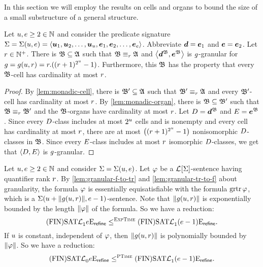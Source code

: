 
In this section we will employ the results on cells and organs to bound the size
of a small substructure of a general structure.

\begin{remark}\label{rem:monadic-granular}
Let $u, e \geq 2 \in \mathbb{N}$ and consider the predicate
signature $\mathrm{\Sigma} = \mathrm{\Sigma}(u,e) =
\left\langle \bm{u}_{1},\bm{u}_{2},\dots,\bm{u}_{u},\bm{e}_{1},\bm{e}_{2},\dots,\bm{e}_{e} \right\rangle$.
Abbreviate $\bm{d} = \bm{e}_{1}$ and $\bm{e} = \bm{e}_{2}$.
Let $r \in \mathbb{N}^{+}$.
There is $\mathfrak{B} \subseteq \mathfrak{A}$ such that
$\mathfrak{B} \equiv_{r} \mathfrak{A}$ and $\left\langle \bm{d}^{\mathfrak{B}}, \bm{e}^{\mathfrak{B}} \right\rangle$ is $g$-granular
for $g = g(u,r) = r.((r+1)^{2^u}-1)$.
Furthermore, this $\mathfrak{B}$ has the property that every $\mathfrak{B}$-cell has
cardinality at most $r$.
\end{remark}
\begin{proof}
By \cref{lem:monadic-cell}, there is $\mathfrak{B'} \subseteq \mathfrak{A}$ such that
$\mathfrak{B'} \equiv_{r} \mathfrak{A}$ and every $\mathfrak{B'}$-cell has cardinality at most $r$.
By \cref{lem:monadic-organ}, there is $\mathfrak{B} \subseteq \mathfrak{B'}$ such that
$\mathfrak{B} \equiv_{r} \mathfrak{B'}$ and the $\mathfrak{B}$-organs have cardinality at most $r$.
Let $D = \bm{d}^{\mathfrak{B}}$ and $E = \bm{e}^{\mathfrak{B}}$.
Since every $D$-class includes at most $2^u$ cells and is
nonempty and every cell has cardinality at most $r$,
there are at most $\left((r+1)^{2^u}-1\right)$ nonisomorphic
$D$-classes in $\mathfrak{B}$.
Since every $E$-class includes at most $r$ isomorphic $D$-classes,
we get that $\left\langle D, E \right\rangle$ is $g$-granular.
\end{proof}
\begin{corollary}\label{cor:monadic-phi}
Let $u, e \geq 2 \in \mathbb{N}$ and consider $\mathrm{\Sigma} = \mathrm{\Sigma}(u,e)$.
Let $\varphi$ be a $\mathcal{L}^{{}}[\mathrm{\Sigma}]$-sentence having quantifier rank $r$.
By \cref{lem:granular-f-to-tr} and \cref{lem:granular-tr-to-f} about
granularity, the formula $\varphi$ is essentially equisatisfiable with the
formula $\operatorname{grtr}\varphi$, which is a
$\mathrm{\Sigma}(u + \|g(u,r)\|,e - 1)$-sentence.
Note that $\|g(u,r)\|$ is exponentially bounded by the length
$\|\varphi\|$ of the formula. So we have a reduction:
\[
  \mathrm{(FIN)SAT}\mathcal{L}^{{}}_{1}{e}\mathrm{E}_{\mathsf{refine}} \leq^{\text{\normalfont{\scshape ExpTime}}}
  \mathrm{(FIN)SAT}\mathcal{L}^{{}}_{1}{(e-1)}\mathrm{E}_{\mathsf{refine}}.
\]
If $u$ is constant, independent of $\varphi$, then $\|g(u,r)\|$ is
polynomially bounded by $\|\varphi\|$. So we have a reduction:
\[
  \mathrm{(FIN)SAT}\mathcal{L}^{{}}_{0}{e}\mathrm{E}_{\mathsf{refine}} \leq^{\text{\normalfont{\scshape PTime}}}
  \mathrm{(FIN)SAT}\mathcal{L}^{{}}_{1}{(e-1)}\mathrm{E}_{\mathsf{refine}}.
\]
\end{corollary}

